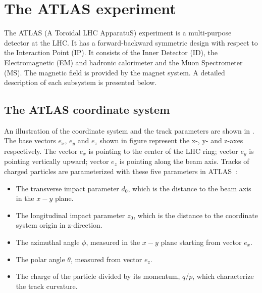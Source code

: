 \section{The ATLAS experiment}

% 

The ATLAS (A Toroidal LHC ApparatuS) experiment is a multi-purpose detector at the LHC. It has a forward-backward symmetric design with respect to the Interaction Point (IP).
It consists of the Inner Detector (ID), the Electromagnetic (EM) and hadronic calorimeter and the Muon Spectrometer (MS). The magnetic field is provided by the magnet system. A detailed description of each subsystem is presented below.

\subsection{The ATLAS coordinate system}

An illustration of the coordinate system and the track parameters are shown in .
The base vectors $e_x$, $e_y$ and $e_z$ shown in figure represent the x-, y- and z-axes respectively. The vector $e_x$ is pointing to the center of the LHC ring;
vector $e_y$ is pointing vertically upward; vector $e_z$ is pointing along the beam axis. 
Tracks of charged particles are parameterized with these five parameters in ATLAS~\cite{track_parameterization}:
\begin{itemize}
 \item The transverse impact parameter $d_0$, which is the distance to the beam axis in the $x-y$ plane. 
 \item The longitudinal impact parameter $z_0$, which is the distance to the coordinate system origin in z-direction.
 \item The azimuthal angle $\phi$, measured in the $x-y$ plane starting from vector $e_x$. 
 \item The polar angle $\theta$, measured from vector $e_z$.
 \item The charge of the particle divided by its momentum, $q/p$, which characterize the track curvature.
\end{itemize}

